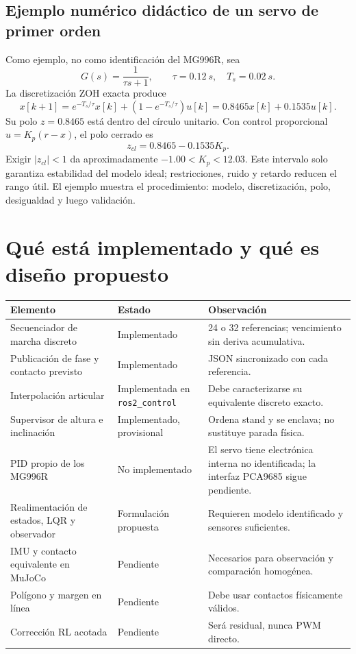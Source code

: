 \documentclass[11pt,letterpaper]{article}
\begin{document}
\subsection{Ejemplo numérico didáctico de un servo de primer orden}
Como ejemplo, no como identificación del MG996R, sea
\begin{equation}
 G(s)=\frac{1}{\tau s+1},\qquad \tau=\SI{0.12}{s},\quad T_s=\SI{0.02}{s}.
\end{equation}
La discretización ZOH exacta produce
\begin{equation}
 x[k+1]=e^{-T_s/\tau}x[k]+(1-e^{-T_s/\tau})u[k]
 =0.8465x[k]+0.1535u[k].
\end{equation}
Su polo $z=0.8465$ está dentro del círculo unitario. Con control proporcional
$u=K_p(r-x)$, el polo cerrado es
\begin{equation}
 z_{cl}=0.8465-0.1535K_p.
\end{equation}
Exigir $|z_{cl}|<1$ da aproximadamente $-1.00<K_p<12.03$. Este intervalo solo
garantiza estabilidad del modelo ideal; restricciones, ruido y retardo reducen
el rango útil. El ejemplo muestra el procedimiento: modelo, discretización,
polo, desigualdad y luego validación.

\section{Qué está implementado y qué es diseño propuesto}
\begin{longtable}{p{5.0cm}p{4.0cm}p{5.0cm}}
\toprule Elemento&Estado&Observación\\\midrule
Secuenciador de marcha discreto&Implementado&24 o 32 referencias; vencimiento
sin deriva acumulativa.\\
Publicación de fase y contacto previsto&Implementado&JSON sincronizado con cada
referencia.\\
Interpolación articular&Implementada en \texttt{ros2\_control}&Debe caracterizarse
su equivalente discreto exacto.\\
Supervisor de altura e inclinación&Implementado, provisional&Ordena stand y se
enclava; no sustituye parada física.\\
PID propio de los MG996R&No implementado&El servo tiene electrónica interna no
identificada; la interfaz PCA9685 sigue pendiente.\\
Realimentación de estados, LQR y observador&Formulación propuesta&Requieren
modelo identificado y sensores suficientes.\\
IMU y contacto equivalente en MuJoCo&Pendiente&Necesarios para observación y
comparación homogénea.\\
Polígono y margen en línea&Pendiente&Debe usar contactos físicamente válidos.\\
Corrección RL acotada&Pendiente&Será residual, nunca PWM directo.\\
\bottomrule
\end{longtable}
\end{document}
